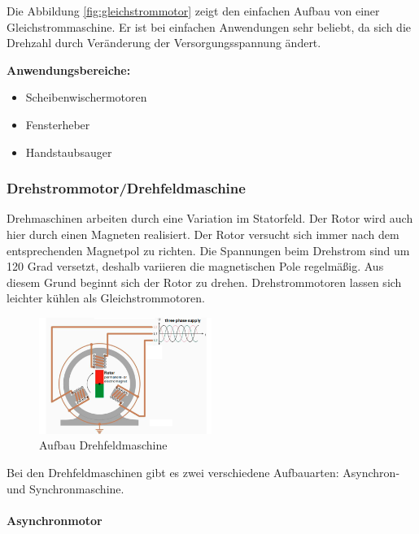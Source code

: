 Die Abbildung \ref{fig:gleichstrommotor} zeigt den einfachen Aufbau von einer Gleichstrommaschine. Er ist bei einfachen Anwendungen sehr beliebt, da sich die Drehzahl durch Veränderung der Versorgungsspannung ändert.

\textbf{Anwendungsbereiche:}

\begin{itemize}
	\item{Scheibenwischermotoren}
	\item{Fensterheber}
	\item{Handstaubsauger}
\end{itemize}

\subsubsection{Drehstrommotor/Drehfeldmaschine}
\label{sec:drehstrom}

Drehmaschinen arbeiten durch eine Variation im Statorfeld. Der Rotor wird auch hier durch einen Magneten realisiert. Der Rotor versucht sich immer nach dem entsprechenden Magnetpol zu richten. Die Spannungen beim Drehstrom sind um 120 Grad versetzt, deshalb variieren die magnetischen Pole regelmäßig. Aus diesem Grund beginnt sich der Rotor zu drehen. Drehstrommotoren lassen sich leichter kühlen als Gleichstrommotoren. 

\begin{figure}[H]
\begin{center}
	\includegraphics[width=0.5\textwidth]{fig/Drehstrommotor}
	\caption{Aufbau Drehfeldmaschine \cite{funktionDrehstrommotor}}
\end{center}
\end{figure}

Bei den Drehfeldmaschinen gibt es zwei verschiedene Aufbauarten: Asynchron- und Synchronmaschine.

\paragraph{Asynchronmotor}
\label{sec:asynchronmotor}

